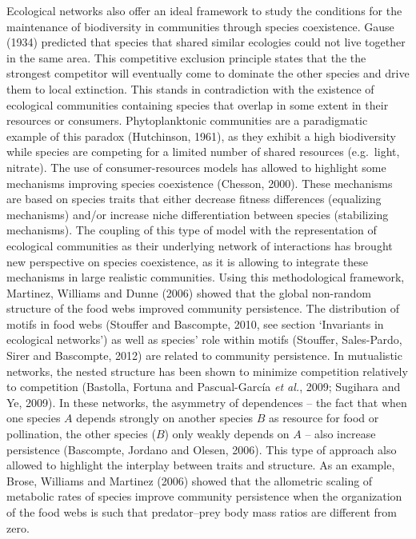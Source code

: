 \documentclass[12pt]{article}
\begin{document}
Ecological networks also offer an ideal framework to study the
conditions for the maintenance of biodiversity in communities through
species coexistence. Gause (1934) predicted that species that shared
similar ecologies could not live together in the same area. This
competitive exclusion principle states that the the strongest competitor
will eventually come to dominate the other species and drive them to
local extinction. This stands in contradiction with the existence of
ecological communities containing species that overlap in some extent in
their resources or consumers. Phytoplanktonic communities are a
paradigmatic example of this paradox (Hutchinson, 1961), as they exhibit
a high biodiversity while species are competing for a limited number of
shared resources (e.g.~light, nitrate). The use of consumer-resources
models has allowed to highlight some mechanisms improving species
coexistence (Chesson, 2000). These mechanisms are based on species
traits that either decrease fitness differences (equalizing mechanisms)
and/or increase niche differentiation between species (stabilizing
mechanisms). The coupling of this type of model with the representation
of ecological communities as their underlying network of interactions
has brought new perspective on species coexistence, as it is allowing to
integrate these mechanisms in large realistic communities. Using this
methodological framework, Martinez, Williams and Dunne (2006) showed
that the global non-random structure of the food webs improved community
persistence. The distribution of motifs in food webs (Stouffer and
Bascompte, 2010, see section `Invariants in ecological networks') as
well as species' role within motifs (Stouffer, Sales-Pardo, Sirer and
Bascompte, 2012) are related to community persistence. In mutualistic
networks, the nested structure has been shown to minimize competition
relatively to competition (Bastolla, Fortuna and Pascual-García \emph{et
al.}, 2009; Sugihara and Ye, 2009). In these networks, the asymmetry of
dependences -- the fact that when one species \(A\) depends strongly on
another species \(B\) as resource for food or pollination, the other
species (\(B\)) only weakly depends on \(A\) -- also increase
persistence (Bascompte, Jordano and Olesen, 2006). This type of approach
also allowed to highlight the interplay between traits and structure. As
an example, Brose, Williams and Martinez (2006) showed that the
allometric scaling of metabolic rates of species improve community
persistence when the organization of the food webs is such that
predator--prey body mass ratios are different from zero.
\end{document}
